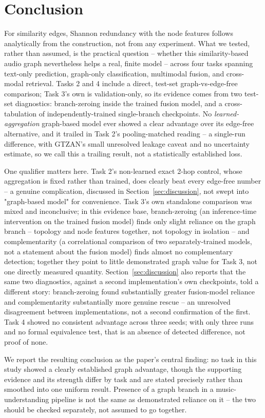 \section{Conclusion}

For similarity edges, Shannon redundancy with the node features follows analytically from
the construction, not from any experiment. What we tested, rather than assumed, is the
practical question -- whether this similarity-based audio graph nevertheless helps a real,
finite model -- across four tasks spanning text-only prediction, graph-only classification,
multimodal fusion, and cross-modal retrieval. Tasks 2 and 4 include a direct, test-set
graph-vs-edge-free comparison; Task 3's own is validation-only, so its evidence comes from
two test-set diagnostics: branch-zeroing inside the trained fusion model, and a
cross-tabulation of independently-trained single-branch checkpoints. No
\emph{learned-aggregation} graph-based model ever showed a clear advantage over its edge-free
alternative, and it trailed in Task 2's pooling-matched reading -- a single-run difference,
with GTZAN's small unresolved leakage caveat and no uncertainty estimate, so we call this a
trailing result, not a statistically established loss.

One qualifier matters here. Task 2's non-learned exact 2-hop control, whose aggregation is
fixed rather than trained, does clearly beat every edge-free number -- a genuine complication,
discussed in Section~\ref{sec:discussion}, not swept into "graph-based model" for
convenience. Task 3's own standalone comparison was mixed and inconclusive; in this evidence
base, branch-zeroing (an inference-time intervention on the trained fusion model) finds only
slight reliance on the graph branch -- topology and node features together, not topology in
isolation -- and complementarity (a correlational comparison of two separately-trained
models, not a statement about the fusion model) finds almost no complementary detection;
together they point to little demonstrated graph value for Task 3, not one directly measured
quantity. Section~\ref{sec:discussion} also reports that the same two diagnostics, against a
second implementation's own checkpoints, told a different story: branch-zeroing found
substantially greater fusion-model reliance and complementarity substantially more genuine
rescue -- an unresolved disagreement between implementations, not a second confirmation of
the first. Task 4 showed no consistent advantage across three seeds; with only three runs and
no formal equivalence test, that is an absence of detected difference, not proof of none.

We report the resulting conclusion as the paper's central finding: no task in this study
showed a clearly established graph advantage, though the supporting evidence and its strength
differ by task and are stated precisely rather than smoothed into one uniform result.
Presence of a graph branch in a music-understanding pipeline is not the same as demonstrated
reliance on it -- the two should be checked separately, not assumed to go together.
